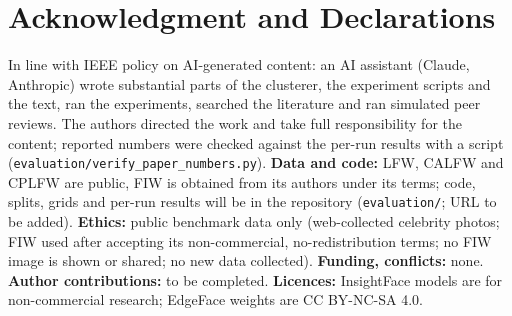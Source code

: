 \documentclass[conference]{IEEEtran}
\begin{document}
\section*{Acknowledgment and Declarations}
In line with IEEE policy on AI-generated content: an AI assistant (Claude, Anthropic) wrote substantial parts of the
clusterer, the experiment scripts and the text, ran the experiments, searched the literature and ran simulated peer reviews.
The authors directed the work and take full responsibility for the content; reported numbers were checked against the
per-run results with a script (\texttt{evaluation/verify\_paper\_numbers.py}).
\textbf{Data and code:} LFW, CALFW and CPLFW are public, FIW is obtained from its authors under its terms; code, splits, grids and per-run results will be in the repository
(\texttt{evaluation/}; URL to be added). \textbf{Ethics:} public benchmark data only (web-collected celebrity photos; FIW used after accepting its non-commercial, no-redistribution terms; no FIW image is shown or shared; no new data collected). \textbf{Funding, conflicts:} none.
\textbf{Author contributions:} to be completed. \textbf{Licences:} InsightFace models are for non-commercial research;
EdgeFace weights are CC BY-NC-SA 4.0.



\end{document}
